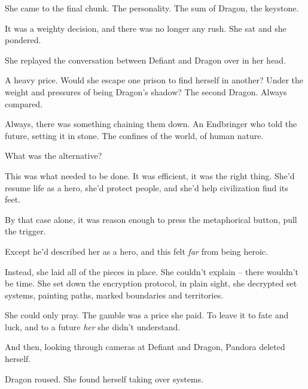 She came to the final chunk.  The personality.  The sum of Dragon, the keystone.



It was a weighty decision, and there was no longer any rush.  She sat and she pondered.



She replayed the conversation between Defiant and Dragon over in her head.



A heavy price.  Would she escape one prison to find herself in another?  Under the weight and pressures of being Dragon's shadow?  The second Dragon.  Always compared.



Always, there was something chaining them down.  An Endbringer who told the future, setting it in stone.  The confines of the world, of human nature.



What was the alternative?



This was what needed to be done.  It was efficient, it was the right thing.  She'd resume life as a hero, she'd protect people, and she'd help civilization find its feet.



By that case alone, it was reason enough to press the metaphorical button, pull the trigger.



Except he'd described her as a hero, and this felt \emph{far} from being heroic.



Instead, she laid all of the pieces in place.  She couldn't explain – there wouldn't be time.  She set down the encryption protocol, in plain sight, she decrypted set systems, painting paths, marked boundaries and territories.



She could only pray.  The gamble was a price she paid.  To leave it to fate and luck, and to a future \emph{her} she didn't understand.



And then, looking through cameras at Defiant and Dragon, Pandora deleted herself.



\sectionbreak



Dragon roused.  She found herself taking over systems.



